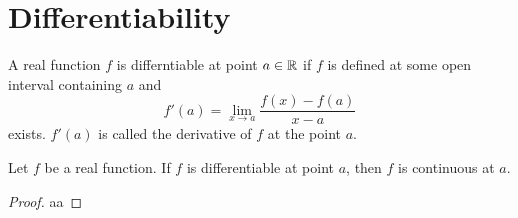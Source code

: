 \documentclass[../note.tex]{subfiles}
\begin{document}
\section{Differentiability}
\begin{definition}[Differentiability]
	A real function $f$ is differntiable at point $a \in \mathbb{R}$ if $f$ is defined at some open interval containing $a$ and 
	\begin{equation}
		f'(a) = \lim_{x \to a} \frac{f(x)-f(a)}{x-a}
	\end{equation}
	exists. $f'(a)$ is called the derivative of $f$ at the point $a$.
\end{definition}

\begin{theorem}
	Let $f$ be a real function. If $f$ is differentiable at point $a$, then $f$ is continuous at $a$.
\end{theorem}

\begin{proof}
aa
\end{proof}
\end{document}
